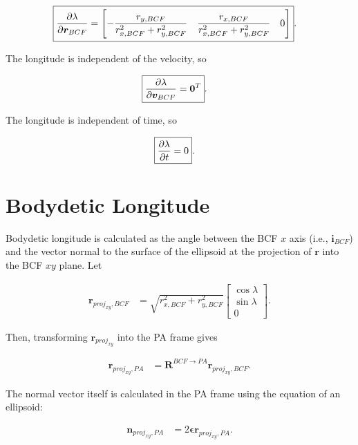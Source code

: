 \documentclass[]{article}
\newcommand{\vb}[1]{\bm{#1}} %
\newcommand{\pd}[2]{\frac{\partial #1}{\partial #2}} %
\begin{document}
\begin{align}
	\label{eq:dlondr}
	\Aboxed{\pd{\lambda}{\vb{r}_{BCF}} &= \left[ -\frac{r_{y, BCF}}{r_{x, BCF}^2 + r_{y, BCF}^2} \quad \frac{r_{x, BCF}}{r_{x, BCF}^2 + r_{y, BCF}^2} \quad 0 \right]}.
\end{align}

The longitude is independent of the velocity, so

\begin{align}
	\Aboxed{\pd{\lambda}{\vb{v}_{BCF}} &= \vb{0}^T}.
\end{align}

The longitude is independent of time, so 

\begin{align}
	\Aboxed{\pd{\lambda}{t} &= 0}.
\end{align}

\section{Bodydetic Longitude}


Bodydetic longitude is calculated as the angle between the BCF $x$ axis (i.e., $\vb{i}_{BCF}$) and the vector normal to the surface of the ellipsoid at the projection of $\vb{r}$ into the BCF $xy$ plane. Let

\begin{align}
	\vb{r}_{proj_{xy},BCF} &= \sqrt{r_{x, BCF}^2 + r_{y, BCF}^2} \left[ \begin{array}{c}
	\cos \lambda \\
	\sin \lambda \\
	0 \end{array} \right].
\end{align}

Then, transforming $\vb{r}_{proj_{xy}}$ into the PA frame gives

\begin{align}
	\vb{r}_{proj_{xy}, PA} &= \vb{R}^{BCF \rightarrow PA} \vb{r}_{proj_{xy},BCF}.
\end{align}

The normal vector itself is calculated in the PA frame using the equation of an ellipsoid:

\begin{align}
	\vb{n}_{proj_{xy}, PA} &= 2 \vb{\epsilon} \vb{r}_{proj_{xy}, PA}.
\end{align}
\end{document}
